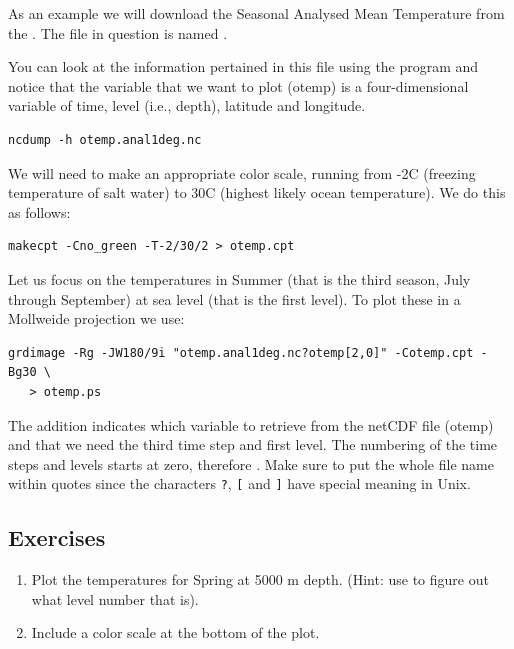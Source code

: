 \documentclass{report}
\begin{document}
As an example we will download the Seasonal Analysed Mean Temperature from the
.
The file in question is named 
.

You can look at the information pertained in this file using the program  and
notice that the variable that we want to plot (otemp) is a four-dimensional variable of time,
level (i.e., depth), latitude and longitude.

{\small\begin{verbatim}
ncdump -h otemp.anal1deg.nc
\end{verbatim}
}

We will need to make an appropriate color scale, running from -2\DS C (freezing temperature of salt
water) to 30\DS C (highest likely ocean temperature). We do this as follows:

{\small\begin{verbatim}
makecpt -Cno_green -T-2/30/2 > otemp.cpt
\end{verbatim}
}

Let us focus on the temperatures in Summer (that is the third season, July through
September) at sea level (that is the first level). To plot these in a Mollweide projection we
use:

{\small\begin{verbatim}
grdimage -Rg -JW180/9i "otemp.anal1deg.nc?otemp[2,0]" -Cotemp.cpt -Bg30 \
   > otemp.ps
\end{verbatim}
}

The addition  indicates which variable to retrieve from the netCDF
file (otemp) and that we need the third time step and first level. The numbering of the
time steps and levels starts at zero, therefore \filename{[2,0]}. Make sure to put the
whole file name within quotes since the characters \verb|?|, \verb|[| and \verb|]| have
special meaning in Unix.

\subsection{Exercises}

\begin{enumerate}

\item Plot the temperatures for Spring at 5000 m depth. (Hint: use  to
figure out what level number that is).

\item Include a color scale at the bottom of the plot.

\end{enumerate}
\end{document}
